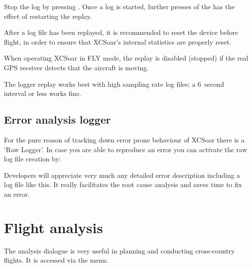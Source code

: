 Stop the log by pressing .
Once a log is started, further presses of the  has the
effect of restarting the replay.

\tip{} After a log file has been replayed, it is recommended to reset
the device before flight, in order to ensure that XCSoar's internal
statistics are properly reset.

When operating XCSoar in FLY mode, the replay is disabled (stopped) if
the real GPS receiver detects that the aircraft is moving.

The logger replay works best with high sampling rate log files;
a 6~second interval or less works fine.

\subsection*{Error analysis logger}\label{sec:raw-logger}
For the pure reason of tracking down error prone behaviour of XCSoar 
there is a `Raw Logger'. In case you are able to reproduce an error you can 
activate the raw log file creation by:
\begin{quote}
\blink{}
\end{quote}
Developers will appreciate very much any detailed error description including a log file like this. It really facilitates the root cause analysis and saves time to fix an error.

\section{Flight analysis}\label{sec:analysis-climb}

The analysis dialogue is very useful in planning and conducting
cross-country flights.  It is accessed via the menu:  
\begin{quote}
\blink{}
\end{quote}

